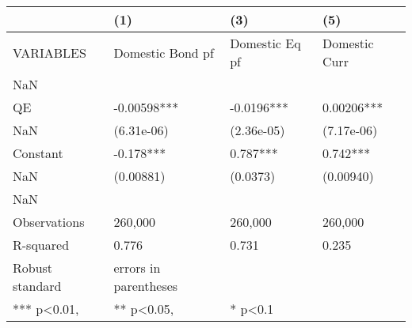 \begin{tabular}{llll}
\toprule
{} &                    (1) &             (3) &            (5) \\
\midrule
VARIABLES        &       Domestic Bond pf &  Domestic Eq pf &  Domestic Curr \\
NaN              &                        &                 &                \\
QE               &            -0.00598*** &      -0.0196*** &     0.00206*** \\
NaN              &             (6.31e-06) &      (2.36e-05) &     (7.17e-06) \\
Constant         &              -0.178*** &        0.787*** &       0.742*** \\
NaN              &              (0.00881) &        (0.0373) &      (0.00940) \\
NaN              &                        &                 &                \\
Observations     &                260,000 &         260,000 &        260,000 \\
R-squared        &                  0.776 &           0.731 &          0.235 \\
Robust standard  &  errors in parentheses &                 &                \\
*** p<0.01,      &            ** p<0.05,  &         * p<0.1 &                \\
\bottomrule
\end{tabular}
